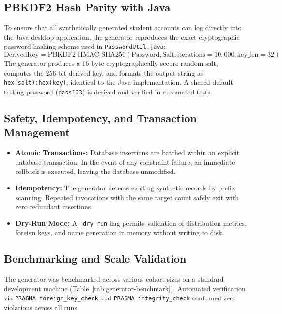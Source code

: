 \subsection{PBKDF2 Hash Parity with Java}
To ensure that all synthetically generated student accounts can log directly into the Java desktop application, the generator reproduces the exact cryptographic password hashing scheme used in \texttt{PasswordUtil.java}:
\begin{equation}
    \text{DerivedKey} = \text{PBKDF2-HMAC-SHA256}(\text{Password}, \text{Salt}, \text{iterations}=10{,}000, \text{key\_len}=32)
\end{equation}
The generator produces a 16-byte cryptographically secure random salt, computes the 256-bit derived key, and formats the output string as \texttt{hex(salt):hex(key)}, identical to the Java implementation. A shared default testing password (\texttt{pass123}) is derived and verified in automated tests.

\subsection{Safety, Idempotency, and Transaction Management}
\begin{itemize}
    \item \textbf{Atomic Transactions:} Database insertions are batched within an explicit database transaction. In the event of any constraint failure, an immediate rollback is executed, leaving the database unmodified.
    \item \textbf{Idempotency:} The generator detects existing synthetic records by prefix scanning. Repeated invocations with the same target count safely exit with zero redundant insertions.
    \item \textbf{Dry-Run Mode:} A \texttt{--dry-run} flag permits validation of distribution metrics, foreign keys, and name generation in memory without writing to disk.
\end{itemize}

\subsection{Benchmarking and Scale Validation}
The generator was benchmarked across various cohort sizes on a standard development machine (Table~\ref{tab:generator-benchmark}). Automated verification via \texttt{PRAGMA foreign\_key\_check} and \texttt{PRAGMA integrity\_check} confirmed zero violations across all runs.

